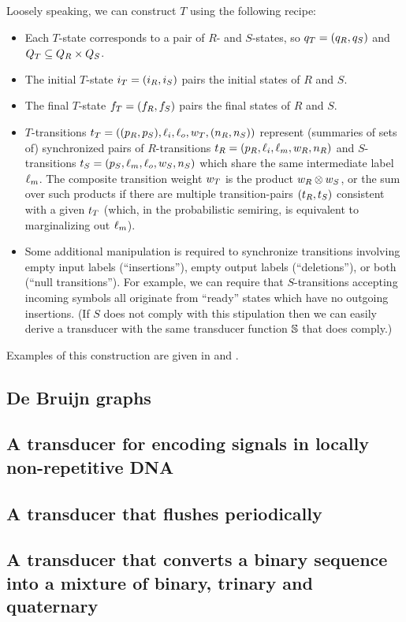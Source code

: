 \documentclass{article}
\begin{document}
Loosely speaking, we can construct $T$ using the following recipe:
\begin{itemize}
\item Each $T$-state corresponds to a pair of $R$- and $S$-states,
so $q_T = (q_R, q_S)$
and $Q_T \subseteq Q_R \times Q_S$.
\item The initial $T$-state $i_T=(i_R,i_S)$ pairs the initial states of $R$ and $S$.
\item The final $T$-state $f_T=(f_R,f_S)$ pairs the final states of $R$ and $S$.
\item $T$-transitions
$t_T = ((p_R,p_S),\ell_i,\ell_o,w_T,(n_R,n_S))$
represent (summaries of sets of) synchronized pairs of $R$-transitions
$t_R = (p_R,\ell_i,\ell_m,w_R,n_R)$
and $S$-transitions
$t_S = (p_S,\ell_m,\ell_o,w_S,n_S)$
which share the same intermediate label $\ell_m$.
The composite transition weight $w_T$ is the product $w_R \otimes w_S$,
or the sum over such products if there are multiple transition-pairs $(t_R,t_S)$
consistent with a given $t_T$
(which, in the probabilistic semiring, is equivalent to marginalizing out $\ell_m$).
\item Some additional manipulation is required to synchronize
transitions involving empty input labels (``insertions''),
empty output labels (``deletions''),
or both (``null transitions'').
For example, we can require that $S$-transitions accepting incoming symbols
all originate from ``ready'' states which have no outgoing insertions.
(If $S$ does not comply with this stipulation then we can easily derive a transducer
with the same transducer function $\mathbb{S}$ that does comply.)
\end{itemize}

Examples of this construction are given in \cite{MohriPereiraRiley2000} and \cite{WestessonEtAlArxiv2012,WestessonEtAl2012}.

\subsection*{De Bruijn graphs}

\subsection*{A transducer for encoding signals in locally non-repetitive DNA}

\subsection*{A transducer that flushes periodically}

\subsection*{A transducer that converts a binary sequence into a mixture of binary, trinary and quaternary}




\end{document}

